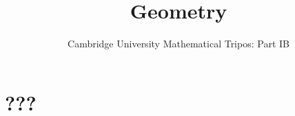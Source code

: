 \documentclass{article}
\title{Geometry}
\author{Cambridge University Mathematical Tripos: Part IB}
\begin{document}
\maketitle

\tableofcontentsnewpage{}

\section{???}

\end{document}
